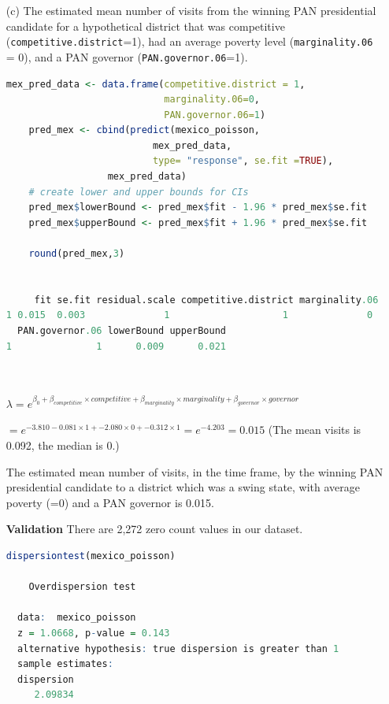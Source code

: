 \documentclass[12pt,letterpaper]{article}
\begin{document}
\begin{enumerate}
	\item [(c)] The estimated mean number of visits from the winning PAN presidential candidate for a hypothetical district that was competitive (\texttt{competitive.district}=1), had an average poverty level (\texttt{marginality.06} = 0), and a PAN governor (\texttt{PAN.governor.06}=1).

  \begin{lstlisting}[language=R]
    mex_pred_data <- data.frame(competitive.district = 1, 
                            marginality.06=0,
                            PAN.governor.06=1)
    pred_mex <- cbind(predict(mexico_poisson,
                          mex_pred_data,
                          type= "response", se.fit =TRUE),
                  mex_pred_data)
    # create lower and upper bounds for CIs
    pred_mex$lowerBound <- pred_mex$fit - 1.96 * pred_mex$se.fit
    pred_mex$upperBound <- pred_mex$fit + 1.96 * pred_mex$se.fit

    round(pred_mex,3)


     fit se.fit residual.scale competitive.district marginality.06
1 0.015  0.003              1                    1              0
  PAN.governor.06 lowerBound upperBound
1               1      0.009      0.021

  
  \end{lstlisting}
  $\lambda = e^{\beta_0 + \beta_{competitive}\times competitive +  \beta_{marginality}\times marginality +  \beta_{governor}\times governor }$
  
  $= e^{ -3.810  - 0.081\times 1 +  -2.080\times 0 +  -0.312\times 1 } = e^{-4.203} = 0.015$  (The mean visits is 0.092, the median is 0.)
	
	The estimated mean number of visits, in the time frame, by the winning PAN presidential candidate to a district which was a swing state, with average poverty (=0) and a PAN governor is 0.015. 
\clearpage

  \item[]
  \textbf{Validation}
  There are 2,272 zero count values in our dataset.
 
  \begin{lstlisting}[language=R]
  dispersiontest(mexico_poisson)

  	Overdispersion test

  data:  mexico_poisson
  z = 1.0668, p-value = 0.143
  alternative hypothesis: true dispersion is greater than 1
  sample estimates:
  dispersion 
     2.09834 
\end{lstlisting}


\end{enumerate}
\end{document}

